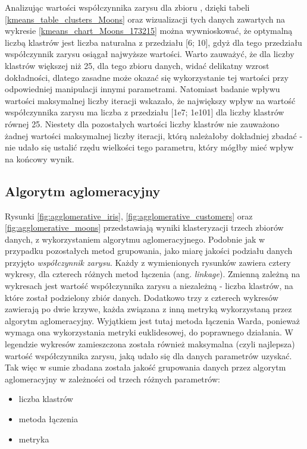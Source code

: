 \documentclass{classrep}
\begin{document}
{{            Analizując wartości współczynnika zarysu dla zbioru \cite{dataset_moons},
            dzięki tabeli \ref{kmeans_table_clusters_Moons} oraz wizualizacji tych
            danych zawartych na wykresie \ref{kmeans_chart_Moons_173215} można
            wywnioskować, że optymalną liczbą klastrów jest liczba naturalna z przedziału [6;
            10], gdyż dla tego przedziału współczynnik zarysu osiągał najwyższe
            wartości. Warto zauważyć, że dla liczby klastrów większej niż 25, dla tego
            zbioru danych, widać delikatny wzrost dokładności, dlatego zasadne może
            okazać się wykorzystanie tej wartości przy odpowiedniej manipulacji innymi
            parametrami. Natomiast badanie wpływu wartości maksymalnej liczby iteracji wskazało, że największy wpływ na wartość współczynnika zarysu ma liczba z przedziału [1e7; 1e101] dla liczby klastrów równej 25. Niestety dla pozostałych wartości liczby klastrów nie zauważono żadnej wartości maksymalnej liczby iteracji, którą należałoby dokładniej zbadać - nie udało się ustalić rzędu wielkości tego parametru, który mógłby mieć wpływ na końcowy wynik.
            
        
        }

        \subsection{Algorytm aglomeracyjny}
        \label{summary_2} {
            Rysunki \ref{fig:agglomerative_iris}, \ref{fig:agglomerative_customers}
            oraz \ref{fig:agglomerative_moons} przedstawiają wyniki klasteryzacji
            trzech zbiorów danych, z wykorzystaniem algorytmu aglomeracyjnego. Podobnie
            jak w przypadku pozostałych metod grupowania, jako miarę jakości podziału
            danych przyjęto \emph{współczynnik zarysu}. Każdy z wymienionych rysunków
            zawiera cztery wykresy, dla czterech różnych metod łączenia (ang.
            \emph{linkage}). Zmienną zależną na wykresach jest wartość współczynnika
            zarysu a niezależną - liczba klastrów, na które został podzielony zbiór
            danych. Dodatkowo trzy z czterech wykresów zawierają po dwie krzywe, każda
            związana z inną metryką wykorzystaną przez algorytm aglomeracyjny.
            Wyjątkiem jest tutaj metoda łączenia Warda, ponieważ wymaga ona
            wykorzystania metryki euklidesowej, do poprawnego działania. W legendzie
            wykresów zamieszczona została również maksymalna (czyli najlepsza) wartość
            współczynnika zarysu, jaką udało się dla danych parametrów uzyskać. Tak
            więc w sumie zbadana została jakość grupowania danych przez algorytm
            aglomeracyjny w zależności od trzech różnych parametrów:
            \begin{itemize}
                \item liczba klastrów
                \item metoda łączenia
                \item metryka
            \end{itemize}

}}
\end{document}
